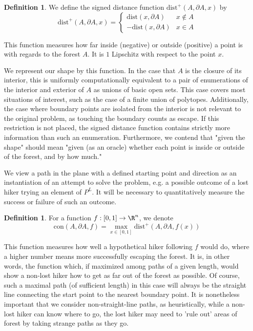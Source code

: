 \documentclass{journal}
\theoremstyle{definition}
\newtheorem{dfn}[thm]{Definition}
\begin{document}
\begin{dfn}
We define the signed distance function $\mathrm{dist}^+(A,\partial A, x)$ by
$$\mathrm{dist}^+(A,\partial A, x) = \begin{cases}
    \mathrm{dist}(x,\partial A) & x\notin A\\
    -\mathrm{dist}(x,\partial A) & x\in A
\end{cases}$$
\end{dfn}
\label{dfn:distplus}

This function measures how far inside (negative) or outside (positive) a point is with regards to the forest $A$. It is $1$ Lipschitz with respect to the point $x$. 

We represent our shape by this function. In the case that $A$ is the closure of its interior, this is uniformly computationally equivalent to a pair of enumerations of the interior and exterior of $A$ as unions of basic open sets. This case covers most situations of interest, such as the case of a finite union of polytopes. Additionally, the case where boundary points are isolated from the interior is not relevant to the original problem, as touching the boundary counts as escape. If this restriction is not placed, the signed distance function contains strictly more information than such an enumeration. Furthermore, we contend that "given the shape" should mean "given (as an oracle) whether each point is inside or outside of the forest, and by how much."

We view a path in the plane with a defined starting point and direction as an instantiation of an attempt to solve the problem, e.g. a possible outcome of a lost hiker trying an element of $P^L$. It will be necessary to quantitatively measure the success or failure of such an outcome.

\begin{dfn}For a function $f:[0,1]\rightarrow \R^n$, we denote 
$$\mathrm{con}(A,\partial A, f) = \max_{x\in[0,1]}\mathrm{dist}^+(A,\partial A, f(x))$$
\end{dfn}
\label{dfn:con}
This function measures how well a hypothetical hiker following $f$ would do, where a higher number means more successfully escaping the forest. It is, in other words, the function which, if maximized among paths of a given length, would show a non-lost hiker how to get as far out of the forest as possible. Of course, such a maximal path (of sufficient length) in this case will always be the straight line connecting the start point to the nearest boundary point. It is nonetheless important that we consider non-straight-line paths, as heuristically, while a non-lost hiker can know where to go, the lost hiker may need to 'rule out' areas of forest by taking strange paths as they go. 
\end{document}
